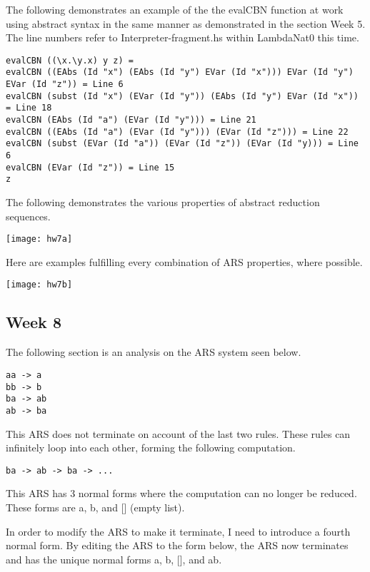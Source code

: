 \documentclass{article}
\theoremstyle{theorem}
\theoremstyle{definition}
\theoremstyle{remark}
\begin{document}
\medskip\noindent
The following demonstrates an example of the the evalCBN function at work using abstract syntax in the same manner as demonstrated in the section Week 5. The line numbers refer to Interpreter-fragment.hs within LambdaNat0 this time.

\begin{lstlisting}
evalCBN ((\x.\y.x) y z) =
evalCBN ((EAbs (Id "x") (EAbs (Id "y") EVar (Id "x"))) EVar (Id "y") EVar (Id "z")) = Line 6
evalCBN (subst (Id "x") (EVar (Id "y")) (EAbs (Id "y") EVar (Id "x")) = Line 18
evalCBN (EAbs (Id "a") (EVar (Id "y"))) = Line 21
evalCBN ((EAbs (Id "a") (EVar (Id "y"))) (EVar (Id "z"))) = Line 22
evalCBN (subst (EVar (Id "a")) (EVar (Id "z")) (EVar (Id "y))) = Line 6
evalCBN (EVar (Id "z")) = Line 15
z
\end{lstlisting}
%
The following demonstrates the various properties of abstract reduction sequences.

\begin{center}
\texttt{[image: hw7a]}
\end{center}
%
Here are examples fulfilling every combination of ARS properties, where possible.

\begin{center}
\texttt{[image: hw7b]}
\end{center}

\subsection{Week 8}
The following section is an analysis on the ARS system seen below.

\begin{lstlisting}
aa -> a
bb -> b
ba -> ab
ab -> ba
\end{lstlisting}
%
This ARS does not terminate on account of the last two rules. These rules can infinitely loop into each other, forming the following computation.

\begin{lstlisting}
ba -> ab -> ba -> ...
\end{lstlisting}
%
This ARS has 3 normal forms where the computation can no longer be reduced. These forms are a, b, and [] (empty list).

\medskip\noindent
In order to modify the ARS to make it terminate, I need to introduce a fourth normal form. By editing the ARS to the form below, the ARS now terminates and has the unique normal forms a, b, [], and ab.
\end{document}
